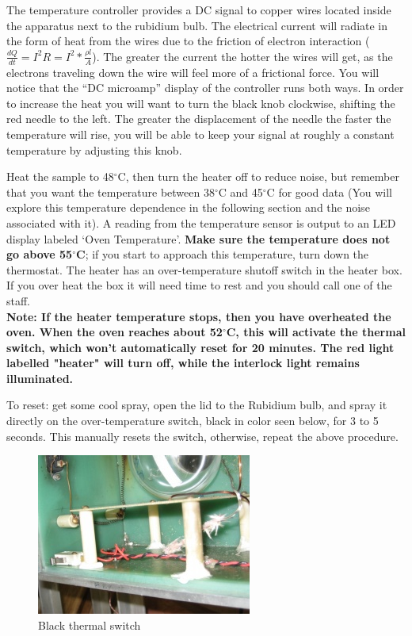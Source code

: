 \documentclass{../lab}
\begin{document}
The temperature controller provides a DC signal to copper wires located inside the apparatus next to the rubidium bulb. The electrical current will radiate in the form of heat from the wires due to the friction of electron interaction ($\frac{dQ}{dt} = I^2 R = I^2 * \frac{\rho l}{A}$).  The greater the current the hotter the wires will get, as the electrons traveling down the wire will feel more of a frictional force. You will notice that the ``DC microamp'' display of the controller runs both ways. In order to increase the heat you will want to turn the black knob clockwise, shifting the red needle to the left. The greater the displacement of the needle the faster the temperature will rise, you will be able to keep your signal at roughly a constant temperature by adjusting this knob. \\

\newpage

Heat the sample to 48$^\circ$C, then turn the heater off to reduce noise, but remember that you want the temperature between 38$^\circ$C and 45$^\circ$C for good data (You will explore this temperature dependence in the following section and the noise associated with it). A reading from the temperature sensor is output to an LED display labeled `Oven Temperature'. \textbf{Make sure the temperature does not go above 55$^\circ$C}; if you start to approach this temperature, turn down the thermostat. The heater has an over-temperature shutoff switch in the heater box. If you over heat the box it will need time to rest and you should call one of the staff. \\

\textbf{Note: If the heater temperature stops, then you have overheated the oven.
When the oven reaches about 52$^\circ$C, this will activate the thermal switch, which won't automatically reset for 20 minutes. The red light labelled "heater" will turn off, while the interlock light remains illuminated.}

To reset: get some cool spray, open the lid to the Rubidium bulb, and spray it directly on the over-temperature switch, black in color seen below, for 3 to 5 seconds. This manually resets the switch, otherwise, repeat the above procedure.

    \begin{figure}[h!]
        \centering
        \includegraphics[width=0.6\linewidth]{images/IMG_4500}
        \caption{Black thermal switch}
    \end{figure}
\end{document}
